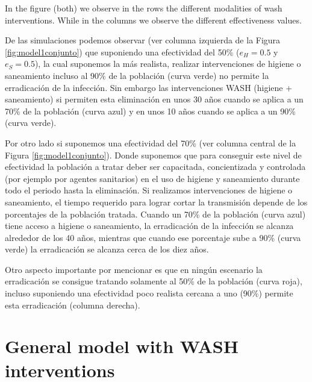 \documentclass[12pt,a4paper]{article}
\theoremstyle{plain}%
\theoremstyle{definition}
\theoremstyle{remark}
\begin{document}
	In the figure (both) we observe in the rows the different modalities of wash interventions. While in the columns we observe the different effectiveness values.

	De las simulaciones podemos observar (ver columna izquierda de la Figura \ref{fig:model1conjunto}) 
	que suponiendo una efectividad del 50\% ($e_H=0.5$ y $e_S=0.5$), la cual suponemos la más realista, realizar intervenciones de higiene o saneamiento incluso al 90\% de la población (curva verde) no permite la erradicación de la infección. Sin embargo las intervenciones WASH (higiene + saneamiento) si permiten esta eliminación en unos 30 años cuando se aplica a un 70\% de la población (curva azul) y en unos 10 años cuando se aplica a un 90\% (curva verde). 
	
	Por otro lado si suponemos una efectividad del 70\% (ver columna central de la Figura \ref{fig:model1conjunto}). 
	Donde suponemos que para conseguir este nivel de efectividad la población a tratar deber ser capacitada, concientizada y controlada (por ejemplo por agentes sanitarios) en el uso de higiene y saneamiento durante todo el periodo hasta la eliminación. 
	Si realizamos intervenciones de 
	higiene o saneamiento, el tiempo requerido para lograr cortar la transmisión depende de los porcentajes de la población tratada. Cuando un 70\% de la población (curva azul) tiene acceso a higiene o saneamiento, la erradicación de la infección se alcanza alrededor de los 40 años, mientras que cuando ese porcentaje sube a 90\% (curva verde) la erradicación se alcanza cerca de los diez años.
	
	
	Otro aspecto importante por mencionar es que en ningún escenario la erradicación se consigue tratando solamente al 50\% de la población (curva roja), incluso suponiendo una efectividad poco realista cercana a uno (90\%) permite esta erradicación (columna derecha).  
	
	\section{General model with WASH interventions}
	
\end{document}

